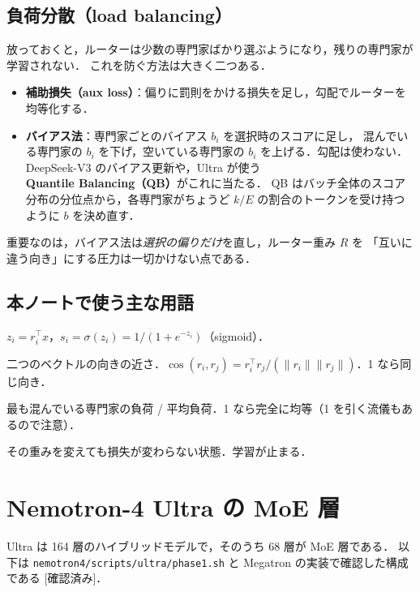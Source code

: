 \documentclass[a4paper,11pt]{ltjsarticle}
\theoremstyle{definition}
\theoremstyle{plain}
\newcommand{\norm}[1]{\lVert #1\rVert}
\newcommand{\T}{^{\top}}
\newcommand{\Ver}{\textsf{\textcolor{cG}{[確認済み]}}}
\begin{document}
\subsection{負荷分散（load balancing）}
放っておくと，ルーターは少数の専門家ばかり選ぶようになり，残りの専門家が学習されない．
これを防ぐ方法は大きく二つある．
\begin{itemize}[leftmargin=*]
\item \textbf{補助損失（aux loss）}：偏りに罰則をかける損失を足し，勾配でルーターを均等化する．
\item \textbf{バイアス法}：専門家ごとのバイアス $b_i$ を選択時のスコアに足し，
  混んでいる専門家の $b_i$ を下げ，空いている専門家の $b_i$ を上げる．勾配は使わない．
  DeepSeek-V3 のバイアス更新や，Ultra が使う \textbf{Quantile Balancing（QB）}がこれに当たる．
  QB はバッチ全体のスコア分布の分位点から，各専門家がちょうど $k/E$ の割合のトークンを受け持つように $b$ を決め直す．
\end{itemize}
重要なのは，バイアス法は\emph{選択の偏りだけ}を直し，ルーター重み $R$ を
「互いに違う向き」にする圧力は一切かけない点である．

\subsection{本ノートで使う主な用語}
\begin{description}[leftmargin=*,font=\normalfont\bfseries]
\item[ロジット $z$ とスコア $s$] $z_i=r_i\T x$，$s_i=\sigma(z_i)=1/(1+e^{-z_i})$（sigmoid）．
\item[コサイン類似度] 二つのベクトルの向きの近さ．$\cos(r_i,r_j)=r_i\T r_j/(\norm{r_i}\norm{r_j})$．1 なら同じ向き．
\item[MaxVio] 最も混んでいる専門家の負荷 / 平均負荷．1 なら完全に均等（1 を引く流儀もあるので注意）．
\item[勾配がゼロ] その重みを変えても損失が変わらない状態．学習が止まる．
\end{description}

\section{Nemotron-4 Ultra の MoE 層}
Ultra は 164 層のハイブリッドモデルで，そのうち 68 層が MoE 層である．
以下は \texttt{nemotron4/scripts/ultra/phase1.sh} と Megatron の実装で確認した構成である \Ver．
\end{document}
